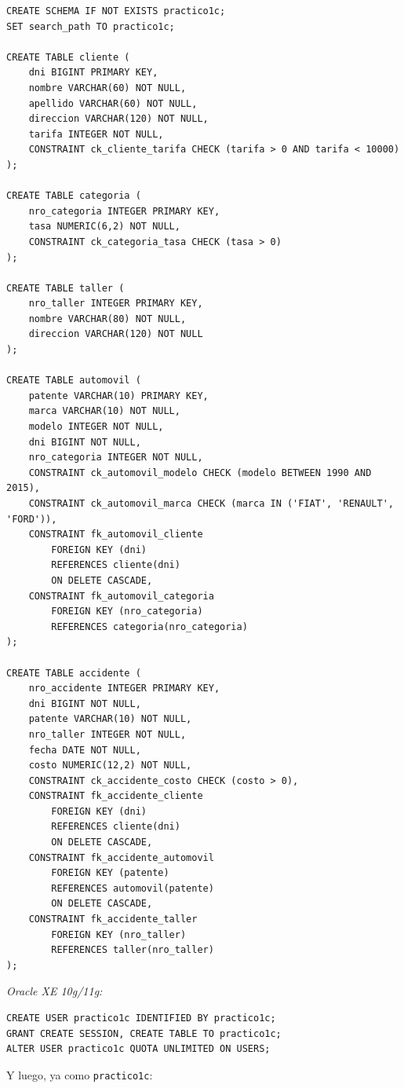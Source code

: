 \documentclass[11pt,a4paper]{article}
\begin{document}
\begin{lstlisting}
CREATE SCHEMA IF NOT EXISTS practico1c;
SET search_path TO practico1c;

CREATE TABLE cliente (
    dni BIGINT PRIMARY KEY,
    nombre VARCHAR(60) NOT NULL,
    apellido VARCHAR(60) NOT NULL,
    direccion VARCHAR(120) NOT NULL,
    tarifa INTEGER NOT NULL,
    CONSTRAINT ck_cliente_tarifa CHECK (tarifa > 0 AND tarifa < 10000)
);

CREATE TABLE categoria (
    nro_categoria INTEGER PRIMARY KEY,
    tasa NUMERIC(6,2) NOT NULL,
    CONSTRAINT ck_categoria_tasa CHECK (tasa > 0)
);

CREATE TABLE taller (
    nro_taller INTEGER PRIMARY KEY,
    nombre VARCHAR(80) NOT NULL,
    direccion VARCHAR(120) NOT NULL
);

CREATE TABLE automovil (
    patente VARCHAR(10) PRIMARY KEY,
    marca VARCHAR(10) NOT NULL,
    modelo INTEGER NOT NULL,
    dni BIGINT NOT NULL,
    nro_categoria INTEGER NOT NULL,
    CONSTRAINT ck_automovil_modelo CHECK (modelo BETWEEN 1990 AND 2015),
    CONSTRAINT ck_automovil_marca CHECK (marca IN ('FIAT', 'RENAULT', 'FORD')),
    CONSTRAINT fk_automovil_cliente
        FOREIGN KEY (dni)
        REFERENCES cliente(dni)
        ON DELETE CASCADE,
    CONSTRAINT fk_automovil_categoria
        FOREIGN KEY (nro_categoria)
        REFERENCES categoria(nro_categoria)
);

CREATE TABLE accidente (
    nro_accidente INTEGER PRIMARY KEY,
    dni BIGINT NOT NULL,
    patente VARCHAR(10) NOT NULL,
    nro_taller INTEGER NOT NULL,
    fecha DATE NOT NULL,
    costo NUMERIC(12,2) NOT NULL,
    CONSTRAINT ck_accidente_costo CHECK (costo > 0),
    CONSTRAINT fk_accidente_cliente
        FOREIGN KEY (dni)
        REFERENCES cliente(dni)
        ON DELETE CASCADE,
    CONSTRAINT fk_accidente_automovil
        FOREIGN KEY (patente)
        REFERENCES automovil(patente)
        ON DELETE CASCADE,
    CONSTRAINT fk_accidente_taller
        FOREIGN KEY (nro_taller)
        REFERENCES taller(nro_taller)
);
\end{lstlisting}

\textit{Oracle XE 10g/11g:}

\begin{lstlisting}
CREATE USER practico1c IDENTIFIED BY practico1c;
GRANT CREATE SESSION, CREATE TABLE TO practico1c;
ALTER USER practico1c QUOTA UNLIMITED ON USERS;
\end{lstlisting}

Y luego, ya como \texttt{practico1c}:
\end{document}
